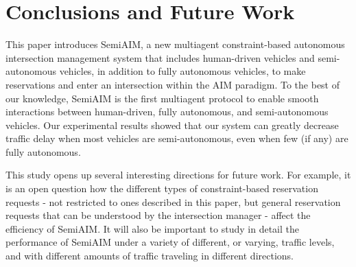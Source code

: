 \section{Conclusions and Future Work}

This paper introduces SemiAIM, a new multiagent constraint-based
autonomous intersection management system that includes human-driven
vehicles and semi-autonomous vehicles, in addition to fully autonomous
vehicles, to make reservations and enter an intersection within the
AIM paradigm.  To the best of our knowledge, SemiAIM is the first
multiagent protocol to enable smooth interactions between
human-driven, fully autonomous, and semi-autonomous vehicles.  Our
experimental results showed that our system can greatly decrease
traffic delay when most vehicles are semi-autonomous, even when few
(if any) are fully autonomous.

This study opens up several interesting directions for future work.
For example, it is an open question how the different types of
constraint-based reservation requests - not restricted to ones
described in this paper, but general reservation requests that can be
understood by the intersection manager - affect the efficiency of
SemiAIM.  It will
also be important to study in detail the performance of SemiAIM under
a variety of different, or varying, traffic levels, and with different
amounts of traffic traveling in different directions.

